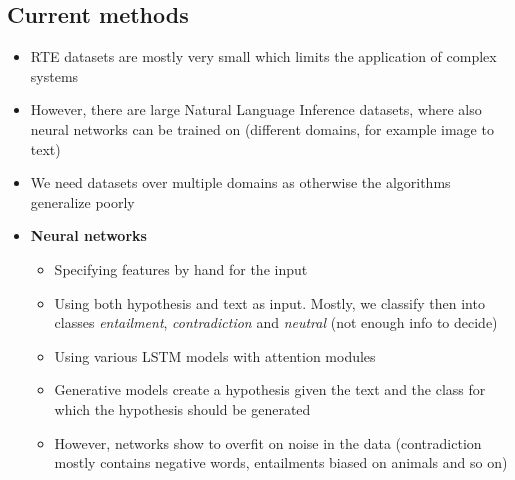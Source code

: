 \subsection{Current methods}
\begin{itemize}
	\item RTE datasets are mostly very small which limits the application of complex systems
	\item However, there are large Natural Language Inference datasets, where also neural networks can be trained on (different domains, for example image to text)
	\item We need datasets over multiple domains as otherwise the algorithms generalize poorly
	\item \textbf{Neural networks}
	\begin{itemize}
		\item Specifying features by hand for the input
		\item Using both hypothesis and text as input. Mostly, we classify then into classes \textit{entailment}, \textit{contradiction} and \textit{neutral} (not enough info to decide)
		\item Using various LSTM models with attention modules 
		\item Generative models create a hypothesis given the text and the class for which the hypothesis should be generated
		\item However, networks show to overfit on noise in the data (contradiction mostly contains negative words, entailments biased on animals and so on)
	\end{itemize}
\end{itemize}